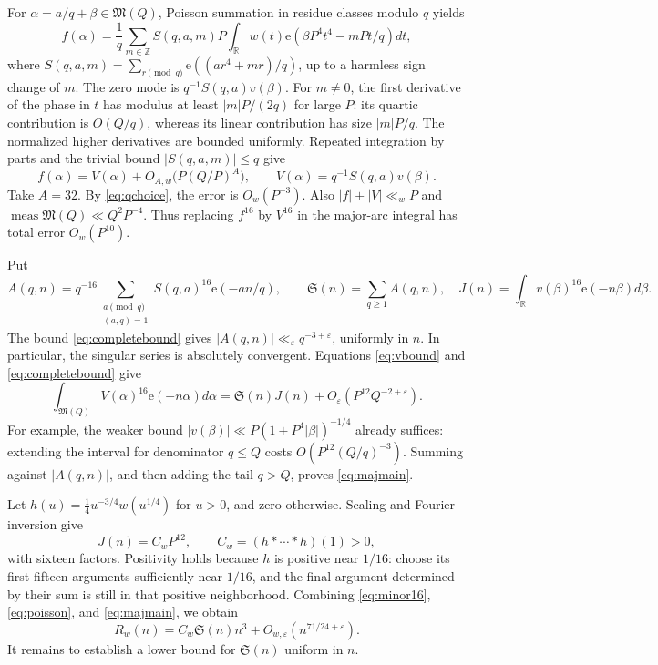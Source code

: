 \documentclass[11pt]{article}
\theoremstyle{remark}\newtheorem*{remark}{Remark}
\newcommand{\e}{\mathrm e}
\newcommand{\eps}{\varepsilon}
\newcommand{\M}{\mathfrak M}
\newcommand{\SSS}{\mathfrak S}
\DeclareMathOperator{\meas}{meas}
\begin{document}
For \(\alpha=a/q+\beta\in\M(Q)\), Poisson summation in residue classes
modulo \(q\) yields
\[
 f(\alpha)=\frac1q\sum_{m\in\mathbb Z}S(q,a,m)
 P\int_{\mathbb R}w(t)\e(\beta P^4t^4-mPt/q)dt,
\]
where \(S(q,a,m)=\sum_{r\pmod q}\e((ar^4+mr)/q)\), up to a harmless
sign change of \(m\). The zero mode is \(q^{-1}S(q,a)v(\beta)\).
For \(m\ne0\), the first derivative of the phase in \(t\) has modulus
at least \(|m|P/(2q)\) for large \(P\): its quartic contribution is
\(O(Q/q)\), whereas its linear contribution has size \(|m|P/q\).
The normalized higher derivatives are bounded uniformly. Repeated
integration by parts and the trivial bound \(|S(q,a,m)|\le q\) give
\begin{equation}\label{eq:poisson}
 f(\alpha)=V(\alpha)+O_{A,w}\bigl(P(Q/P)^A\bigr),
 \qquad V(\alpha)=q^{-1}S(q,a)v(\beta).
\end{equation}
Take \(A=32\). By \eqref{eq:qchoice}, the error is \(O_w(P^{-3})\).
Also \(|f|+|V|\ll_wP\) and
\(\meas\M(Q)\ll Q^2P^{-4}\). Thus replacing \(f^{16}\) by
\(V^{16}\) in the major-arc integral has total error \(O_w(P^{10})\).

Put
\[
 A(q,n)=q^{-16}\sum_{\substack{a\pmod q\\(a,q)=1}}
 S(q,a)^{16}\e(-an/q),\qquad
 \SSS(n)=\sum_{q\ge1}A(q,n),
 \quad J(n)=\int_{\mathbb R}v(\beta)^{16}\e(-n\beta)d\beta.
\]
The bound \eqref{eq:completebound} gives
\(|A(q,n)|\ll_\eps q^{-3+\eps}\), uniformly in \(n\). In particular,
the singular series is absolutely convergent. Equations
\eqref{eq:vbound} and \eqref{eq:completebound} give
\begin{equation}\label{eq:majmain}
 \int_{\M(Q)}V(\alpha)^{16}\e(-n\alpha)d\alpha
 =\SSS(n)J(n)+O_\eps(P^{12}Q^{-2+\eps}).
\end{equation}
For example, the weaker bound
\(|v(\beta)|\ll P(1+P^4|\beta|)^{-1/4}\) already suffices:
extending the interval for denominator \(q\le Q\) costs
\(O(P^{12}(Q/q)^{-3})\). Summing against \(|A(q,n)|\), and then
adding the tail \(q>Q\), proves \eqref{eq:majmain}.

Let \(h(u)=\tfrac14u^{-3/4}w(u^{1/4})\) for \(u>0\), and zero
otherwise. Scaling and Fourier inversion give
\[
 J(n)=C_wP^{12},\qquad C_w=(h*\cdots*h)(1)>0,
\]
with sixteen factors. Positivity holds because \(h\) is positive near
\(1/16\): choose its first fifteen arguments sufficiently near
\(1/16\), and the final argument determined by their sum is still in
that positive neighborhood. Combining \eqref{eq:minor16},
\eqref{eq:poisson}, and \eqref{eq:majmain}, we obtain
\begin{equation}\label{eq:weightedcount}
 R_w(n)=C_w\SSS(n)n^3+O_{w,\eps}(n^{71/24+\eps}).
\end{equation}
It remains to establish a lower bound for \(\SSS(n)\) uniform in \(n\).
\end{document}
